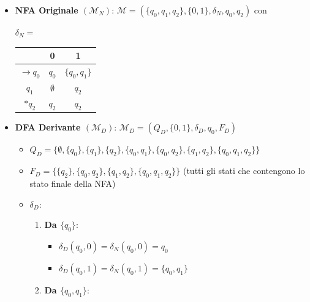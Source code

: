 \documentclass[12pt, a4paper]{report}
\begin{document}
                \begin{example}{}
                    \begin{itemize}
                        \item \textbf{NFA Originale $\left(\mathcal{M}_N\right)$}: $\mathcal{M}=\left(\{q_0,q_1,q_2\},\{0,1\},\delta_N,q_0,q_2\right)$ con \begin{center}
                            $\delta_N=$ \begin{tabular}{|c|c|c|}
                                \hline
                                & 0 & 1 \\
                                \hline
                                $\to q_0$ & $q_0$ & $\{q_0,q_1\}$\\
                                \hline
                                $q_1$ & $\emptyset$ & $q_2$\\
                                \hline
                                $*q_2$ & $q_2$ & $q_2$\\
                                \hline
                            \end{tabular}
                        \end{center}
                        \item \textbf{DFA Derivante $(\mathcal{M}_D)$}: $\mathcal{M}_D=(Q_D,\{0,1\},\delta_D,q_0,F_D)$ \begin{itemize}
                            \item $Q_D=\{\emptyset,\{q_0\},\{q_1\},\{q_2\},\{q_0,q_1\},\{q_0,q_2\},\{q_1,q_2\},\{q_0,q_1,q_2\}\}$
                            \item $F_D=\{\{q_2\},\{q_0,q_2\},\{q_1,q_2\},\{q_0,q_1,q_2\}\}$ (tutti gli stati che contengono lo stato finale della NFA)
                            \item $\delta_D$: \begin{enumerate}
                                \item \textbf{Da $\{q_0\}$}: \begin{itemize}
                                    \item $\delta_D(q_0,0)=\delta_N(q_0,0)=q_0$
                                    \item $\delta_D(q_0,1)=\delta_N(q_0,1)=\{q_0,q_1\}$
                                \end{itemize}
                                \item \textbf{Da $\{q_0,q_1\}$}: \begin{itemize}

\end{itemize}
\end{enumerate}
\end{itemize}
\end{itemize}
\end{example}
\end{document}
